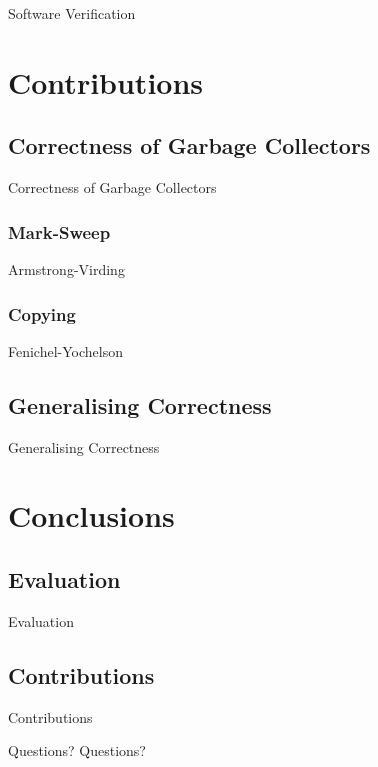\documentclass{beamer}
\begin{document}
\begin{frame}{Software Verification}
\end{frame}


\section{Contributions}
\subsection{Correctness of Garbage Collectors}

\begin{frame}{Correctness of Garbage Collectors}
\end{frame}

\subsubsection{Mark-Sweep}

\begin{frame}{Armstrong-Virding}
\end{frame}

\subsubsection{Copying}

\begin{frame}{Fenichel-Yochelson}
\end{frame}

\subsection{Generalising Correctness}

\begin{frame}{Generalising Correctness}
\end{frame}


\section{Conclusions}
\subsection{Evaluation}

\begin{frame}{Evaluation}
\end{frame}

\subsection{Contributions}

\begin{frame}{Contributions}
\end{frame}


\begin{frame}{Questions?}
  \centering \huge Questions?
\end{frame}
\end{document}
